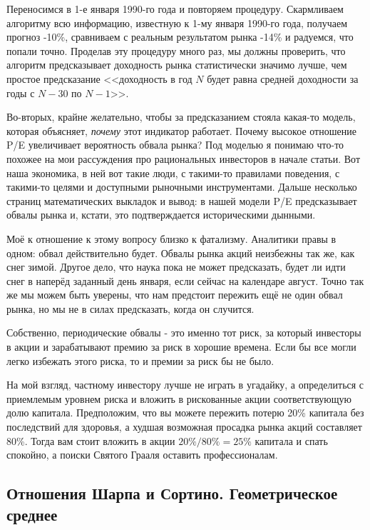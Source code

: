 Переносимся в 1-е января 1990-го года и повторяем процедуру. Скармливаем 
алгоритму всю информацию, известную к 1-му января 1990-го года, получаем прогноз 
-10\%, сравниваем с реальным результатом рынка -14\% и радуемся, что попали 
точно. Проделав эту процедуру много раз, мы должны проверить, что алгоритм 
предсказывает доходность рынка статистически значимо лучше, чем простое 
предсказание <<доходность в год $N$ будет равна средней доходности за годы с 
$N-30$ по $N-1$>>.

Во-вторых, крайне желательно, чтобы за предсказанием стояла какая-то модель, 
которая объясняет, \emph{почему} этот индикатор работает. Почему высокое 
отношение P/E увеличивает вероятность обвала рынка? Под моделью я понимаю что-то 
похожее на мои рассуждения про рациональных инвесторов в начале статьи. Вот наша 
экономика, в ней вот такие люди, с такими-то правилами поведения, с такими-то 
целями и доступными рыночными инструментами. Дальше несколько страниц 
математических выкладок и вывод: в нашей модели P/E предсказывает обвалы рынка 
и, кстати, это подтверждается историческими дынными.

Моё к отношение к этому вопросу близко к фатализму. Аналитики правы в одном: 
обвал действительно будет. Обвалы рынка акций неизбежны так же, как снег зимой. 
Другое дело, что наука пока не может предсказать, будет ли идти снег в наперёд 
заданный день января, если сейчас на календаре август. Точно так же мы можем 
быть уверены, что нам предстоит пережить ещё не один обвал рынка, но мы не в 
силах предсказать, когда он случится.

Собственно, периодические обвалы - это именно тот риск, за который инвесторы в 
акции и зарабатывают премию за риск в хорошие времена. Если бы все могли легко 
избежать этого риска, то и премии за риск бы не было.

На мой взгляд, частному инвестору лучше не играть в угадайку, а определиться с 
приемлемым уровнем риска и вложить в рискованные акции соответствующую долю 
капитала. Предположим, что вы можете пережить потерю 20\% капитала без 
последствий для здоровья, а худшая возможная просадка рынка акций составляет
80\%. Тогда вам стоит вложить в акции $20\%/80\% = 25\%$ капитала и спать 
спокойно, а поиски Святого Грааля оставить профессионалам.

\subsection{Отношения Шарпа и Сортино. Геометрическое среднее}

